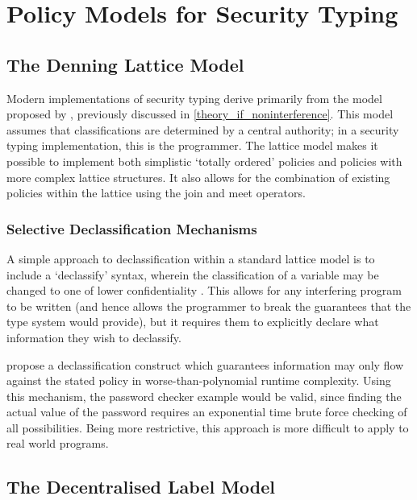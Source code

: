 \section{Policy Models for Security Typing}

\subsection{The Denning Lattice Model}

Modern implementations of security typing derive primarily from the model proposed by \citeauthor{denning1977certification} \cite{denning1977certification}, previously discussed in \ref{theory_if_noninterference}. This model assumes that classifications are determined by a central authority; in a security typing implementation, this is the programmer. The lattice model makes it possible to implement both simplistic `totally ordered' policies and policies with more complex lattice structures. It also allows for the combination of existing policies within the lattice using the join and meet operators.

\subsubsection{Selective Declassification Mechanisms}

A simple approach to declassification within a standard lattice model is to include a `declassify' syntax, wherein the classification of a variable may be changed to one of lower confidentiality \cite{denning1974declassification}. This allows for any interfering program to be written (and hence allows the programmer to break the guarantees that the type system would provide), but it requires them to explicitly declare what information they  wish to declassify.

\citeauthor{volpano2000declassification} \cite{volpano2000declassification} propose a declassification construct which guarantees information may only flow against the stated policy in worse-than-polynomial runtime complexity. Using this mechanism, the password checker example would be valid, since finding the actual value of the password requires an exponential time brute force checking of all possibilities. Being more restrictive, this approach is more difficult to apply to real world programs.

\subsection{The Decentralised Label Model} \label{theory_if_dlm}

